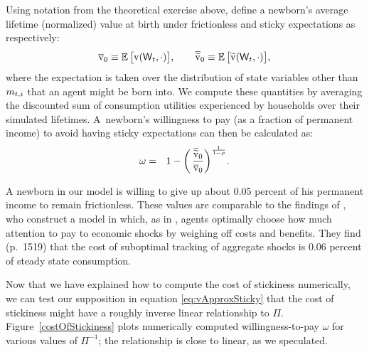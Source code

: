 \documentclass[titlepage]{./econtex}
\begin{document}
Using notation from the theoretical exercise above, define a newborn's average lifetime (normalized) value at birth under frictionless and sticky expectations as respectively:
\begin{equation*}
\overline{\mathrm{v}}_0 \equiv \operatorname{\mathbb{E}} \big[ \mathrm{v}(\mathsf{W}_t,\cdot)\big], \qquad \overline{\widetilde{\mathrm{v}}}_0 \equiv \operatorname{\mathbb{E}} \big[ \widetilde{\mathrm{v}}(\mathsf{W}_t,\cdot)\big],
\end{equation*}
where the expectation is taken over the distribution of state variables other than $m_{t,i}$ that an agent might be born into.  We compute these quantities by averaging the discounted sum of consumption utilities experienced by households over their simulated lifetimes.  A~newborn's willingness to pay (as a fraction of permanent income) to avoid having sticky expectations can then be calculated as:
\begin{eqnarray}\label{eq:WTP}
\omega & = & 1 - \bigg(\,\frac{\overline{\widetilde{\mathrm{v}}}_0}{\overline{\mathrm{v}}_0} \bigg)^{\frac{1}{1-\rho}}.
\end{eqnarray}

A newborn in our model is willing to give up about 0.05 percent of his permanent income to remain frictionless.  These values are comparable to the findings of \cite{mackWiedREStud15}, who construct a model in which, as in \cite{reis:inattentive}, agents optimally choose how much attention to pay to economic shocks by weighing off costs and benefits.  They find (p.\ 1519) that the cost of suboptimal tracking of aggregate shocks is 0.06 percent of steady state consumption. 

Now that we have explained how to compute the cost of stickiness numerically, we can test our supposition in equation \eqref{eq:vApproxSticky} that the cost of stickiness might have a roughly inverse linear relationship to $\Pi$.  Figure~\ref{costOfStickiness} plots numerically computed willingness-to-pay $\omega$ for various values of $\Pi^{-1}$; the relationship is close to linear, as we speculated.
\end{document}
